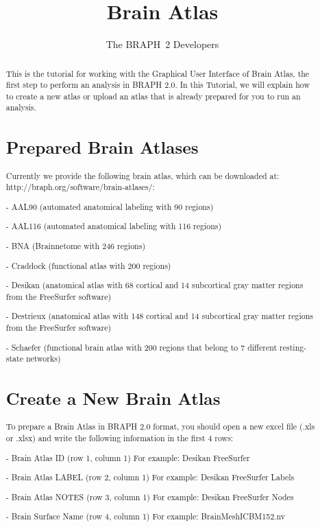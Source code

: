 \documentclass{tufte-handout}
\title{Brain Atlas}
\author[The BRAPH~2 Developers]{The BRAPH~2 Developers}
\begin{document}
\maketitle

\begin{abstract}
\noindent
This is the tutorial for working with the Graphical User Interface of Brain Atlas, the first step to perform an analysis in BRAPH 2.0. 
In this Tutorial, we will explain how to create a new atlas or upload an atlas that is already prepared for you to run an analysis.

\section{Prepared Brain Atlases}

Currently we provide the following brain atlas, which can be downloaded at: http://braph.org/software/brain-atlases/:


- AAL90 (automated anatomical labeling with 90 regions)


- AAL116 (automated anatomical labeling with 116 regions)


- BNA (Brainnetome with 246 regions)


- Craddock (functional atlas with 200 regions)


- Desikan (anatomical atlas with 68 cortical and 14 subcortical gray matter regions from the FreeSurfer software)


-  Destrieux (anatomical atlas with 148 cortical and 14 subcortical gray matter regions from the FreeSurfer software)


- Schaefer (functional brain atlas with 200 regions that belong to 7 different resting-state networks)


\section{Create a New Brain Atlas}

To prepare a Brain Atlas in BRAPH 2.0 format, you should open a new excel file (.xls or .xlsx) and write the following information in the first 4 rows:

- Brain Atlas ID (row 1, column 1)
For example: Desikan FreeSurfer


- Brain Atlas LABEL (row 2, column 1)
For example: Desikan FreeSurfer Labels


- Brain Atlas NOTES (row 3, column 1)
For example: Desikan FreeSurfer Nodes


- Brain Surface Name (row 4, column 1)
For example: BrainMeshICBM152.nv



\end{abstract}
\end{document}

